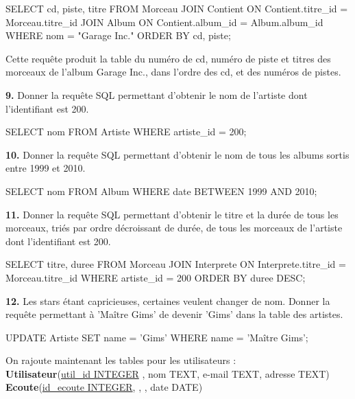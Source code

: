 \documentclass[a4paper,10pt,french]{book}
\begin{document}
    \begin{sql}
        SELECT cd, piste, titre FROM Morceau
        JOIN Contient ON Contient.titre_id = Morceau.titre_id
        JOIN Album ON Contient.album_id = Album.album_id WHERE nom = "Garage Inc."
        ORDER BY cd, piste;
    \end{sql}
    \begin{encadre}[Réponse]
        Cette requête produit la table du numéro de cd, numéro de piste et titres des morceaux de l'album \og Garage Inc.\fg{}, dans l'ordre des  cd, et des numéros de pistes.
    \end{encadre}
    
    
    
    \textbf{9.} Donner la requête SQL permettant d’obtenir le nom de l’artiste dont l’identifiant est 200.
    
    \begin{sql}
        SELECT nom FROM Artiste
        WHERE artiste_id = 200;
    \end{sql}
    \textbf{10.}	Donner la requête SQL permettant d’obtenir le nom de tous les albums sortis entre 1999 et 2010.
    \begin{sql}
        SELECT nom FROM Album
        WHERE date BETWEEN 1999 AND 2010;    
    \end{sql}
    \textbf{11.}	Donner la requête SQL permettant d’obtenir le titre et la durée de tous les morceaux, triés par ordre décroissant de durée, de tous les morceaux de l’artiste dont l’identifiant est 200.
    \begin{sql}
        SELECT titre, duree FROM Morceau
        JOIN Interprete ON Interprete.titre_id = Morceau.titre_id
        WHERE artiste_id = 200 ORDER BY duree DESC;
    \end{sql}
    \textbf{12.}	Les stars étant capricieuses, certaines veulent changer de nom. Donner la requête permettant à 'Maître Gims' de devenir 'Gims' dans la table des artistes.
    \begin{sql}
        UPDATE Artiste
        SET name = 'Gims'
        WHERE name = 'Maître Gims';
    \end{sql}
    
    
    
    On rajoute maintenant les tables pour les utilisateurs :\\
    
    \textbf{Utilisateur}(\uline{util\_id INTEGER} , nom TEXT, e-mail TEXT, adresse TEXT)\\
    \textbf{Ecoute}(\uline{id\_ecoute INTEGER}, , , date DATE)\\
    
\end{document}
